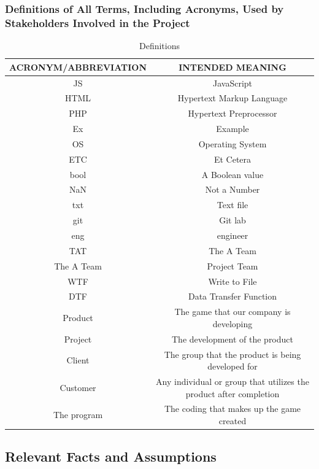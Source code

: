 \documentclass[11pt, oneside]{article}   	%
\begin{document}
\subsubsection*{Definitions of All Terms, Including Acronyms, Used by Stakeholders Involved in the Project}
\begin{table}[H]
\caption{Definitions}
\begin{center}
\begin{tabular}{|c|c|}
\hline
\hline
ACRONYM/ABBREVIATION & INTENDED MEANING\\
\hline
JS & JavaScript\\
\hline
HTML &Hypertext Markup Language\\
\hline
PHP & Hypertext Preprocessor\\
\hline
Ex & Example\\
\hline
OS & Operating System\\
\hline
ETC & Et Cetera\\
\hline
bool & A Boolean value\\
\hline
NaN & Not a Number\\
\hline
txt & Text file\\
\hline
git & Git lab\\
\hline
eng & engineer\\
\hline
TAT & The A Team\\
\hline
The A Team & Project Team\\
\hline
WTF & Write to File\\
\hline
DTF & Data Transfer Function\\
\hline
Product & The game that our company is developing\\
\hline
Project & The development of the product\\
\hline
Client & The group that the product is being developed for\\
\hline
Customer & Any individual or group that utilizes the product after completion\\
\hline
The program & The coding that makes up the game created\\
\hline
\hline
\end{tabular}
\end{center}
\label{default}
\end{table}%



\subsection*{Relevant Facts and Assumptions}
\end{document}
